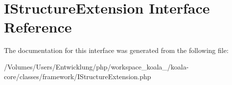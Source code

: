 \hypertarget{interface_i_structure_extension}{
\section{IStructureExtension Interface Reference}
\label{interface_i_structure_extension}
}


The documentation for this interface was generated from the following file:\begin{DoxyCompactItemize}
\item 
/Volumes/Users/Entwicklung/php/workspace\_\-koala\_/koala-\/core/classes/framework/IStructureExtension.php\end{DoxyCompactItemize}
